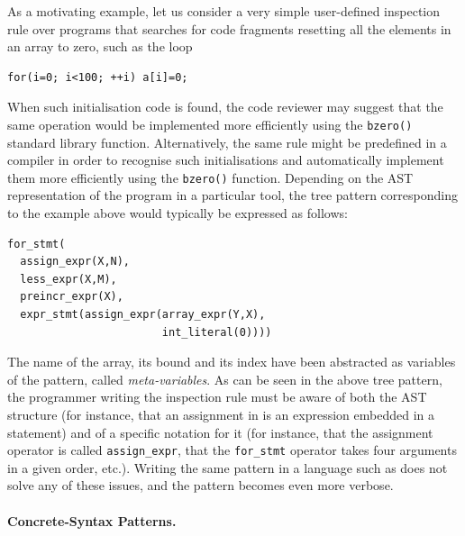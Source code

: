As a motivating example, let us consider a very simple
user\hyp{}defined inspection rule over \Clang programs that searches
for code fragments resetting all the elements in an array to zero,
such as the loop
\begin{verbatim}
for(i=0; i<100; ++i) a[i]=0;
\end{verbatim}
\noindent When such initialisation code is found, the code reviewer
may suggest that the same operation would be implemented more
efficiently using the \texttt{bzero()} standard library
function. Alternatively, the same rule might be predefined in a
compiler in order to recognise such initialisations and automatically
implement them more efficiently using the \texttt{bzero()}
function. Depending on the AST representation of the \Clang program
in a particular tool, the tree pattern corresponding to the example
above would typically be expressed as follows:
{\small
\begin{verbatim}
for_stmt(
  assign_expr(X,N),
  less_expr(X,M),
  preincr_expr(X),
  expr_stmt(assign_expr(array_expr(Y,X),
                        int_literal(0))))
\end{verbatim}
}
\noindent The name of the array, its bound and its index have been
abstracted as variables of the pattern, called
\emph{meta\hyp{}variables}. As can be seen in the above tree pattern,
the programmer writing the inspection rule must be aware of both the
AST structure (for instance, that an assignment in \Clang is an
expression embedded in a statement) and of a specific notation for it
(for instance, that the assignment operator is called
\texttt{assign\_expr}, that the \texttt{for\_stmt} operator takes four
arguments in a given order, etc.). Writing the same pattern in a
language such as \XPath does not solve any of these issues, and the
pattern becomes even more verbose.

\paragraph{Concrete\hyp{}Syntax Patterns.}

